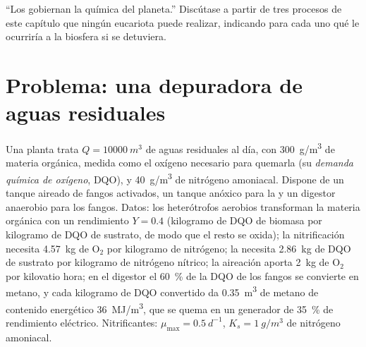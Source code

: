 \begin{exercise}[$\star\star\star$]\label{exo:b2:microbial-metabolism:12}
``Los  gobiernan la química del planeta.'' Discútase a partir
de tres procesos de este capítulo que ningún eucariota puede realizar,
indicando para cada uno qué le ocurriría a la biosfera si se detuviera.
\end{exercise}

\section{Problema: una depuradora de aguas residuales}

\begin{problem}
\label{pb:b2:microbial-metabolism:1}
Una planta trata $Q = \qty{10000}{m^3}$ de aguas residuales al día, con
\qty{300}{g/m^3} de materia orgánica, medida como el oxígeno necesario
para quemarla (su \emph{demanda química de oxígeno}, DQO), y
\qty{40}{g/m^3} de nitrógeno amoniacal. Dispone de un tanque aireado de
fangos activados, un tanque anóxico para la  y un
digestor anaerobio para los fangos. Datos: los heterótrofos aerobios
transforman la materia orgánica con un rendimiento $Y = 0.4$ (kilogramo de
DQO de biomasa por kilogramo de DQO de sustrato, de modo que el resto se
oxida); la nitrificación necesita \qty{4.57}{kg} de $\mathrm{O_2}$ por
kilogramo de nitrógeno; la  necesita \qty{2.86}{kg} de
DQO de sustrato por kilogramo de nitrógeno nítrico; la aireación aporta
\qty{2}{kg} de $\mathrm{O_2}$ por kilovatio hora; en el digestor el
\qty{60}{\%} de la DQO de los fangos se convierte en metano, y cada
kilogramo de DQO convertido da \qty{0.35}{m^3} de metano de contenido
energético \qty{36}{MJ/m^3}, que se quema en un generador de
\qty{35}{\%} de rendimiento eléctrico. Nitrificantes:
$\mu_{\max} = \qty{0.5}{d^{-1}}$, $K_s =
\qty{1}{g/m^3}$ de nitrógeno
amoniacal.


\end{problem}
